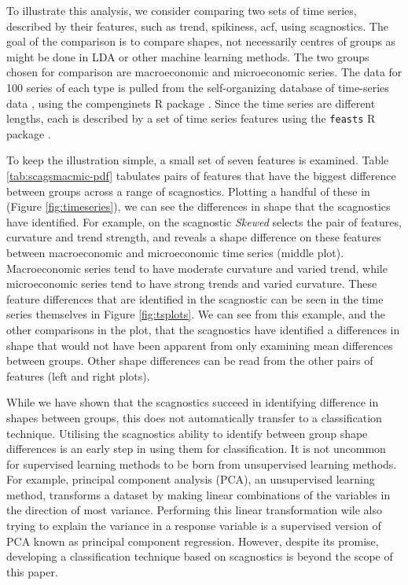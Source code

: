 To illustrate this analysis, we consider comparing two sets of time
series, described by their features, such as trend, spikiness, acf,
using scagnostics. The goal of the comparison is to compare shapes, not
necessarily centres of groups as might be done in LDA or other machine
learning methods. The two groups chosen for comparison are macroeconomic
and microeconomic series. The data for 100 series of each type is pulled
from the self-organizing database of time-series data \citep{sots},
using the compenginets R package \citep{compenginets}. Since the time
series are different lengths, each is described by a set of time series
features \citep[chapter 4 of][]{fpp} using the \texttt{feasts} R package
\citep{feasts}.

To keep the illustration simple, a small set of seven features is
examined. Table \ref{tab:scagsmacmic-pdf} tabulates pairs of features
that have the biggest difference between groups across a range of
scagnostics. Plotting a handful of these in (Figure
\ref{fig:timeseries}), we can see the differences in shape that the
scagnostics have identified. For example, on the scagnostic
\emph{Skewed} selects the pair of features, curvature and trend
strength, and reveals a shape difference on these features between
macroeconomic and microeconomic time series (middle plot). Macroeconomic
series tend to have moderate curvature and varied trend, while
microeconomic series tend to have strong trends and varied curvature.
These feature differences that are identified in the scagnostic can be
seen in the time series themselves in Figure \ref{fig:tsplots}. We can
see from this example, and the other comparisons in the plot, that the
scagnostics have identified a differences in shape that would not have
been apparent from only examining mean differences between groups. Other
shape differences can be read from the other pairs of features (left and
right plots).

While we have shown that the scagnostics succeed in identifying
difference in shapes between groups, this does not automatically
transfer to a classification technique. Utilising the scagnostics
ability to identify between group shape differences is an early step in
using them for classification. It is not uncommon for supervised
learning methods to be born from unsupervised learning methods. For
example, principal component analysis (PCA), an unsupervised learning
method, transforms a dataset by making linear combinations of the
variables in the direction of most variance. Performing this linear
transformation wile also trying to explain the variance in a response
variable is a supervised version of PCA known as principal component
regression. However, despite its promise, developing a classification
technique based on scagnostics is beyond the scope of this paper.


